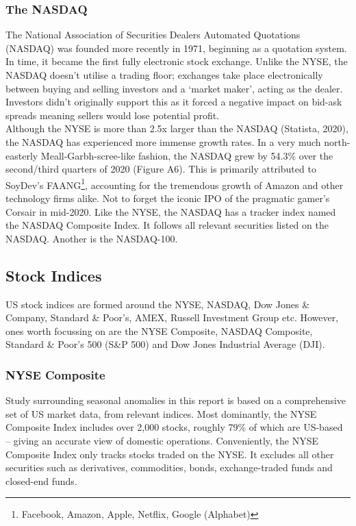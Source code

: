 \documentclass[11pt, english]{article}
\begin{document}
		\subsubsection{The NASDAQ}

		The National Association of Securities Dealers Automated Quotations (NASDAQ) was founded more recently in 1971, beginning as a quotation system. In time, it became the first fully electronic stock exchange. Unlike the NYSE, the NASDAQ doesn’t utilise a trading floor; exchanges take place electronically between buying and selling investors and a `market maker', acting as the dealer. Investors didn’t originally support this as it forced a negative impact on bid-ask spreads meaning sellers would lose potential profit.\\

		Although the NYSE is more than 2.5x larger than the NASDAQ (Statista, 2020), the NASDAQ has experienced more immense growth rates. In a very much north-easterly Meall-Garbh-scree-like fashion, the NASDAQ grew by 54.3\% over the second/third quarters of 2020 (Figure A6). This is primarily attributed to SoyDev’s FAANG\footnote{Facebook, Amazon, Apple, Netflix, Google (Alphabet)}, accounting for the tremendous growth of Amazon and other technology firms alike. Not to forget the iconic IPO of the pragmatic gamer’s Corsair in mid-2020. Like the NYSE, the NASDAQ has a tracker index named the NASDAQ Composite Index. It follows all relevant securities listed on the NASDAQ. Another is the NASDAQ-100.

	\newpage

	\subsection{Stock Indices}

	US stock indices are formed around the NYSE, NASDAQ, Dow Jones \& Company, Standard \& Poor’s, AMEX, Russell Investment Group etc. However, ones worth focussing on are the NYSE Composite, NASDAQ Composite, Standard \& Poor’s 500 (S\&P 500) and Dow Jones Industrial Average (DJI).

		\subsubsection{NYSE Composite}

		Study surrounding seasonal anomalies in this report is based on a comprehensive set of US market data, from relevant indices. Most dominantly, the NYSE Composite Index includes over 2,000 stocks, roughly 79\% of which are US-based – giving an accurate view of domestic operations. Conveniently, the NYSE Composite Index only tracks stocks traded on the NYSE. It excludes all other securities such as derivatives, commodities, bonds, exchange-traded funds and closed-end funds.
\end{document}
